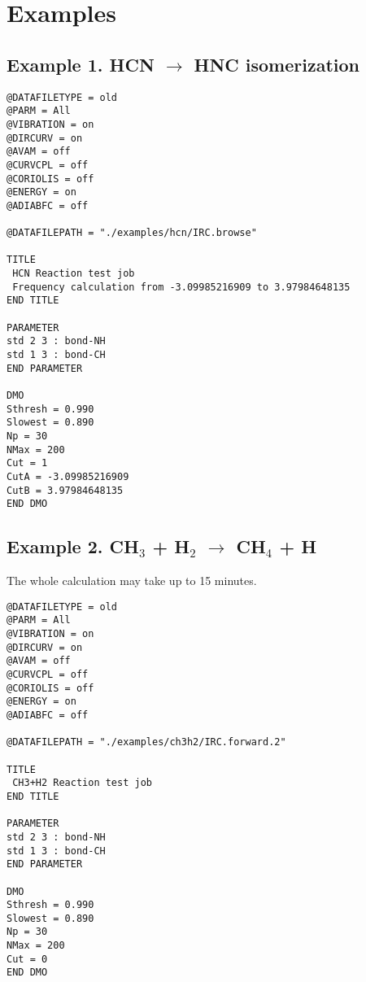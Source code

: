 \chapter{Examples}


\section{Example 1. HCN $\rightarrow$ HNC isomerization}

\begin{tcolorbox}

\begingroup\singlespacing
\begin{verbatim}
@DATAFILETYPE = old   
@PARM = All 
@VIBRATION = on
@DIRCURV = on  
@AVAM = off  
@CURVCPL = off  
@CORIOLIS = off  
@ENERGY = on
@ADIABFC = off

@DATAFILEPATH = "./examples/hcn/IRC.browse"

TITLE
 HCN Reaction test job
 Frequency calculation from -3.09985216909 to 3.97984648135
END TITLE

PARAMETER
std 2 3 : bond-NH
std 1 3 : bond-CH
END PARAMETER

DMO
Sthresh = 0.990
Slowest = 0.890
Np = 30
NMax = 200
Cut = 1
CutA = -3.09985216909
CutB = 3.97984648135
END DMO

\end{verbatim}
\endgroup

\end{tcolorbox}



\section{Example 2. CH$_3$ + H$_2$ $\rightarrow$ CH$_4$ + H}

The whole calculation may take up to 15 minutes.


\begin{tcolorbox}

\begingroup\singlespacing
\begin{verbatim}
@DATAFILETYPE = old   
@PARM = All 
@VIBRATION = on
@DIRCURV = on  
@AVAM = off  
@CURVCPL = off  
@CORIOLIS = off  
@ENERGY = on
@ADIABFC = off

@DATAFILEPATH = "./examples/ch3h2/IRC.forward.2"

TITLE
 CH3+H2 Reaction test job
END TITLE

PARAMETER
std 2 3 : bond-NH
std 1 3 : bond-CH
END PARAMETER

DMO
Sthresh = 0.990
Slowest = 0.890
Np = 30
NMax = 200
Cut = 0
END DMO

\end{verbatim}
\endgroup

\end{tcolorbox}



